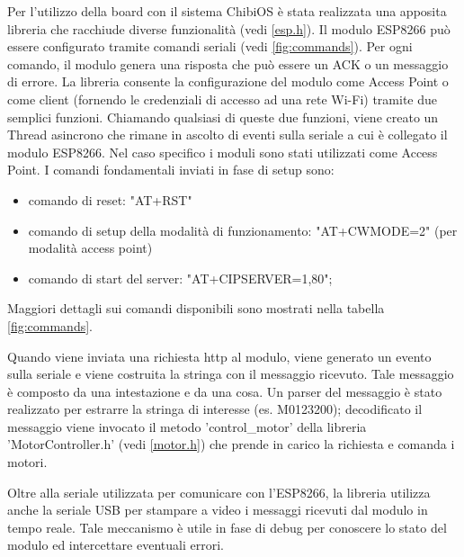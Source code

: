 \documentclass [11pt ,a4paper ,twoside ]{report}
\begin{document}
 Per l'utilizzo della board con il sistema ChibiOS \`e stata realizzata una apposita libreria che racchiude diverse funzionalit\`a (vedi \ref{esp.h}). Il modulo ESP8266 pu\`o essere configurato tramite comandi seriali (vedi \ref{fig:commands}). Per ogni comando, il modulo genera una risposta che pu\`o essere un ACK o un messaggio di errore.
La libreria consente la configurazione del modulo come Access Point o come client (fornendo le credenziali di accesso ad una rete Wi-Fi) tramite due semplici funzioni. Chiamando qualsiasi di queste due funzioni, viene creato un Thread asincrono che rimane in ascolto di eventi sulla seriale a cui \`e collegato il modulo ESP8266. Nel caso specifico i moduli sono stati utilizzati come Access Point.
I comandi fondamentali inviati in fase di setup sono:
\begin{itemize}
	\item comando di reset: "AT+RST"
	\item comando di setup della modalit\`a di funzionamento: "AT+CWMODE=2" (per modalit\`a access point)
	\item comando di start del server:  "AT+CIPSERVER=1,80";
\end{itemize}
Maggiori dettagli sui comandi disponibili sono mostrati nella tabella \ref{fig:commands}.
\par Quando viene inviata una richiesta http al modulo, viene generato un evento sulla seriale e viene costruita la stringa con il messaggio ricevuto. Tale messaggio \`e composto da una intestazione e da una cosa. Un parser del messaggio \`e stato realizzato per estrarre la stringa di interesse (es. M0123200); decodificato il messaggio viene invocato il metodo 'control\_motor' della libreria 'MotorController.h' (vedi \ref{motor.h}) che prende in carico la richiesta e comanda i motori.
\par Oltre alla seriale utilizzata per comunicare con l'ESP8266, la libreria utilizza anche la seriale USB per stampare a video i messaggi ricevuti dal modulo in tempo reale. Tale meccanismo \`e utile in fase di debug per conoscere lo stato del modulo ed intercettare eventuali errori. 
\end{document}
